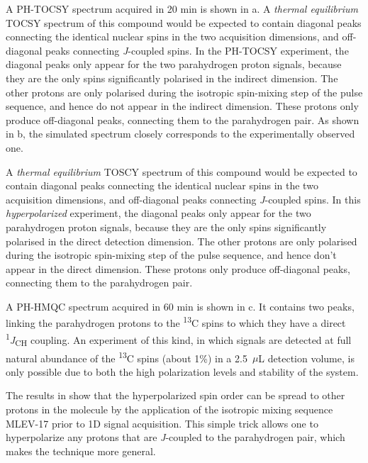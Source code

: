 A PH-TOCSY spectrum acquired in 20 min is shown in a.
A \emph{thermal equilibrium} TOCSY spectrum of this compound would be
expected to
contain diagonal peaks connecting the identical nuclear spins in the two
acquisition dimensions, and off-diagonal peaks connecting \emph{J}-coupled
spins. In the PH-TOCSY experiment, the diagonal peaks only appear
for the two parahydrogen proton signals, because they are the only spins
significantly polarised in the indirect dimension. The other protons
are only polarised during the isotropic spin-mixing step of the pulse sequence,
and hence do not appear in the indirect dimension. These protons only produce
off-diagonal peaks, connecting them to the parahydrogen pair.
As shown in b, the simulated spectrum
closely corresponds to the experimentally observed one.

A \emph{thermal equilibrium} TOSCY spectrum of this compound would be expected to
contain diagonal peaks connecting the identical nuclear spins in the two
acquisition dimensions, and off-diagonal peaks connecting \emph{J}-coupled
spins. In this \emph{hyperpolarized} experiment, the diagonal peaks only appear
for the two parahydrogen proton signals, because they are the only spins
significantly polarised in the direct detection dimension. The other protons
are only polarised during the isotropic spin-mixing step of the pulse sequence,
and hence don't appear in the direct dimension. These protons only produce
off-diagonal peaks, connecting them to the parahydrogen pair.

A PH-HMQC spectrum acquired in 60 min is shown in c.
It contains two peaks, linking the parahydrogen protons to the
\textsuperscript{13}C spins to which they have a direct
\textsuperscript{1}\emph{J}\textsubscript{CH} coupling.
An experiment of this kind, in which signals are
detected at full natural abundance of the \textsuperscript{13}C spins (about
1\%) in a 2.5~$\mu$L  detection volume, is only possible due to both the high
polarization levels and stability of the system.

The results in  show that the hyperpolarized spin order
can be spread to other
protons in the molecule by the application of the isotropic mixing
sequence MLEV-17
 \cite{levittSupercyclesBroadbandHeteronuclear1982,baxMLEV17basedTwodimensionalHomonuclear1985}
 prior to 1D signal acquisition.
 This simple trick
allows one to hyperpolarize any protons that are \emph{J}-coupled to the
parahydrogen pair, which makes the technique more general.

